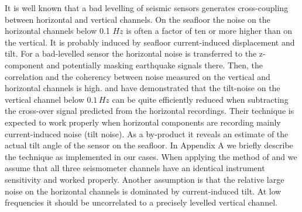 \documentclass{article}
\begin{document}
{%
It is well known that a bad levelling of seismic sensors generates
cross-coupling between horizontal and vertical channels.
On the seafloor the noise on the horizontal channels below 0.1 $Hz$ is 
often a factor of ten or more higher than on the vertical.
It is probably induced 
by seafloor current-induced displacement and tilt.
For a bad-levelled sensor the horizontal noise is transferred to the z-component
and potentially masking earthquake signals there.
Then, the correlation and the coherency between noise measured on 
the vertical and horizontal channels is high.
\cite{crawford:00} and \cite{stutzmann:01} have demonstrated that the tilt-noise on the 
vertical channel below $0.1\, Hz$ can 
be quite efficiently reduced when 
subtracting the cross-over signal predicted from 
the horizontal recordings. 
Their technique is expected to work properly when 
horizontal components are recording 
mainly current-induced noise (tilt noise).
As a by-product it reveals an estimate of the actual tilt angle of the 
sensor on the seafloor.
In Appendix A we briefly describe the technique as implemented 
in our cases.
When applying the method of \cite{crawford:00} and 
\cite{webb:99} we 
assume that all three seismometer channels 
have an identical instrument sensitivity and worked 
properly. 
Another assumption is that the relative large noise on the 
horizontal channels is dominated by current-induced tilt.
At low frequencies it should be uncorrelated  to 
a precisely levelled vertical channel.



}
\end{document}
